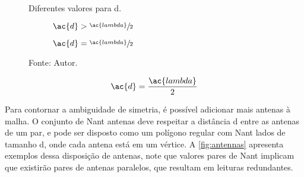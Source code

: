 \begin{figure}[htbp]
    \caption{Diferentes valores para \ac{d}.}
    \label{fig:AoA_d}

    \hfill
    \begin{subfigure}[b]{0.45\textwidth}
        \centering
        \caption{$\ac{d} > \sfrac{\ac{lambda}}{2}$}
        
        \label{fig:AoA_d:fail}
    \end{subfigure}
    \hfill
    \begin{subfigure}[b]{0.45\textwidth}
        \centering
        \caption{$\ac{d} = \sfrac{\ac{lambda}}{2}$}
        
        \label{fig:AoA_d:ok}
    \end{subfigure}
    \hfill

    \caption*{Fonte: Autor.}
\end{figure}

\begin{equation} \label{eq:distancia} %
    \ac{d} = \frac{\ac{lambda}}{2}
\end{equation}


Para contornar a ambiguidade de simetria, é possível adicionar mais antenas à malha.
O conjunto de \ac{Nant} antenas deve respeitar a distância \ac{d} entre as antenas de um par, e pode ser disposto como um polígono regular com \ac{Nant} lados de tamanho \ac{d}, onde cada antena está em um vértice.
A \autoref{fig:antennas} apresenta exemplos dessa disposição de antenas, note que valores pares de \ac{Nant} implicam que existirão pares de antenas paralelos, que resultam em leituras redundantes.

